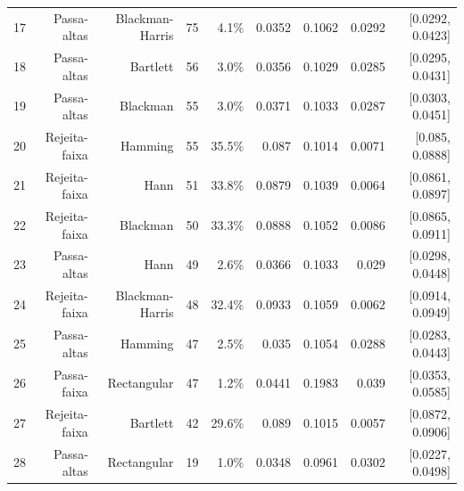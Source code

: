 \begin{longtable}{lrrrrrrrr}
    17 & Passa-altas & Blackman-Harris & 75 & 4.1\% & 0.0352 & 0.1062 & 0.0292 & [0.0292, 0.0423] \\
    18 & Passa-altas & Bartlett & 56 & 3.0\% & 0.0356 & 0.1029 & 0.0285 & [0.0295, 0.0431] \\
    19 & Passa-altas & Blackman & 55 & 3.0\% & 0.0371 & 0.1033 & 0.0287 & [0.0303, 0.0451] \\
    20 & Rejeita-faixa & Hamming & 55 & 35.5\% & 0.087 & 0.1014 & 0.0071 & [0.085, 0.0888] \\
    21 & Rejeita-faixa & Hann & 51 & 33.8\% & 0.0879 & 0.1039 & 0.0064 & [0.0861, 0.0897] \\
    22 & Rejeita-faixa & Blackman & 50 & 33.3\% & 0.0888 & 0.1052 & 0.0086 & [0.0865, 0.0911] \\
    23 & Passa-altas & Hann & 49 & 2.6\% & 0.0366 & 0.1033 & 0.029 & [0.0298, 0.0448] \\
    24 & Rejeita-faixa & Blackman-Harris & 48 & 32.4\% & 0.0933 & 0.1059 & 0.0062 & [0.0914, 0.0949] \\
    25 & Passa-altas & Hamming & 47 & 2.5\% & 0.035 & 0.1054 & 0.0288 & [0.0283, 0.0443] \\
    26 & Passa-faixa & Rectangular & 47 & 1.2\% & 0.0441 & 0.1983 & 0.039 & [0.0353, 0.0585] \\
    27 & Rejeita-faixa & Bartlett & 42 & 29.6\% & 0.089 & 0.1015 & 0.0057 & [0.0872, 0.0906] \\
    28 & Passa-altas & Rectangular & 19 & 1.0\% & 0.0348 & 0.0961 & 0.0302 & [0.0227, 0.0498] \\
    \bottomrule
  \end{longtable}
